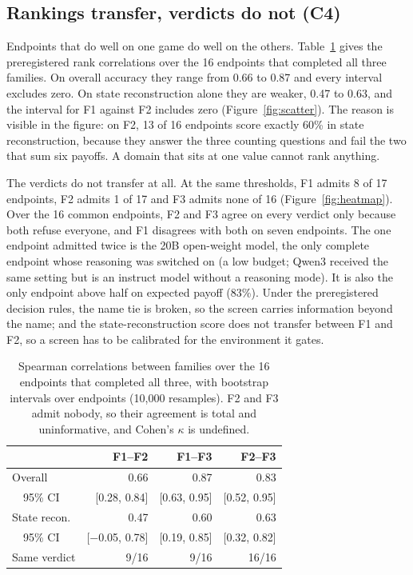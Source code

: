 \documentclass[11pt]{article}
\begin{document}
\subsection{Rankings transfer, verdicts do not (C4)}
\label{sec:res-transfer}

Endpoints that do well on one game do well on the others.
Table~\ref{tab:transfer} gives the preregistered rank correlations over the 16
endpoints that completed all three families. On overall accuracy they range
from 0.66 to 0.87 and every interval excludes zero. On state reconstruction
alone they are weaker, 0.47 to 0.63, and the interval for F1 against F2 includes
zero (Figure~\ref{fig:scatter}). The reason is visible in the figure: on F2,
13 of 16 endpoints score exactly 60\% in state reconstruction, because they
answer the three counting questions and fail the two that sum six payoffs. A
domain that sits at one value cannot rank anything.

The verdicts do not transfer at all. At the same thresholds, F1 admits 8 of
17 endpoints, F2 admits 1 of 17 and F3 admits none of 16
(Figure~\ref{fig:heatmap}). Over the 16 common endpoints, F2 and F3 agree
on every verdict only because both refuse everyone, and F1 disagrees with both
on seven endpoints. The one endpoint admitted twice is the 20B open-weight
model, the only complete endpoint whose reasoning was switched on (a low
budget; Qwen3 received the same setting but is an instruct model without a
reasoning mode). It is also the only endpoint above half on expected payoff
(83\%). Under the preregistered decision rules, the name tie
is broken, so the screen carries information beyond the name; and the
state-reconstruction score does not transfer between F1 and F2, so a screen has
to be calibrated for the environment it gates.

\begin{table}[t]
  \centering
  \small
  \setlength{\tabcolsep}{3.5pt}
  \begin{tabular}{@{}lrrr@{}}
    \toprule
    & F1--F2 & F1--F3 & F2--F3 \\
    \midrule
    Overall & 0.66 & 0.87 & 0.83 \\
    \ \ 95\% CI & [0.28, 0.84] & [0.63, 0.95] & [0.52, 0.95] \\
    State recon. & 0.47 & 0.60 & 0.63 \\
    \ \ 95\% CI & [$-$0.05, 0.78] & [0.19, 0.85] & [0.32, 0.82] \\
    Same verdict & 9/16 & 9/16 & 16/16 \\
    \bottomrule
  \end{tabular}
  \caption{Spearman correlations between families over the 16 endpoints that
  completed all three, with bootstrap intervals over endpoints (10,000
  resamples). F2 and F3 admit nobody, so their agreement is total and
  uninformative, and Cohen's $\kappa$ is undefined.}
  \label{tab:transfer}
\end{table}
\end{document}
